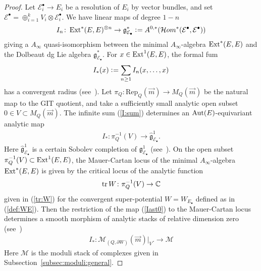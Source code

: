 \documentclass[11pt]{amsart}
\theoremstyle{plain}
\theoremstyle{definition}
\theoremstyle{remark}
\newcommand{\eE}{\mathcal{E}}
\newcommand{\hH}{\mathcal{H}}
\newcommand{\mM}{\mathcal{M}}
\newcommand{\Ext}{\mathop{\rm Ext}\nolimits}
\newcommand{\Aut}{\mathop{\rm Aut}\nolimits}
\newcommand{\tr}{\mathop{\rm tr}\nolimits}
\begin{document}
\begin{proof}
Let $\eE^{\bullet}_i \to E_i$ be a resolution of $E_i$ by vector bundles, 
and set 
$\eE^{\bullet}=\oplus_{i=1}^k V_i \otimes \eE_i^{\bullet}$. 
We have linear maps of degree $1-n$
\begin{align}\label{linear:I}
I_n \colon \Ext^{\ast}(E, E)^{\otimes n} \to 
\mathfrak{g}_{\eE_{\bullet}}^{\ast} \cneq
A^{0, \ast}(\hH om^{\ast}(\eE^{\bullet}, \eE^{\bullet}))
\end{align}
giving a $A_{\infty}$ quasi-isomorphism 
between the minimal 
$A_{\infty}$-algebra 
$\Ext^{\ast}(E, E)$ and
the Dolbeaut dg Lie algebra $\mathfrak{g}_{\eE_{\bullet}}^{\ast}$. 
 For $x \in \Ext^1(E, E)$, the formal fum
 \begin{align}\label{I:sum}
 I_{\ast}(x) \cneq \sum_{n\ge 1}I_n(x, \ldots, x)
 \end{align}
 has a convergent radius
 (see~\cite[Lemma~4.1]{Todstack}).
Let $\pi_Q \colon \mathrm{Rep}_Q(\vec{m}) \to M_Q(\vec{m})$ be the 
natural map to the GIT quotient,
and 
take a sufficiently small analytic open subset 
$0 \in V \subset M_Q(\vec{m})$. 
The infinite sum (\ref{I:sum})
determines an $\Aut(E)$-equivariant 
analytic map
\begin{align}\label{Iast0}
I_{\ast} \colon \pi_Q^{-1}(V) \to \widehat{\mathfrak{g}}_{\eE_{\bullet}}^1.
\end{align}
Here $\widehat{\mathfrak{g}}_{\eE_{\bullet}}^1$
is a certain Sobolev completion of 
$\mathfrak{g}_{\eE_{\bullet}}^1$
(see~\cite[Lemma~5.1]{Todstack}). 
On the open subset 
$\pi_Q^{-1}(V) \subset \Ext^1(E, E)$, the Mauer-Cartan 
locus of the minimal $A_{\infty}$-algebra
$\Ext^{\ast}(E, E)$
is given by the critical 
locus of 
the analytic function
\begin{align*}
\tr W \colon \pi_Q^{-1}(V) \to \mathbb{C}
\end{align*}
given
in (\ref{tr:W})
for 
the convergent super-potential 
$W=W_{E_{\bullet}}$ defined as in (\ref{def:WE}). 
Then the restriction of the map (\ref{Iast0}) 
to the Mauer-Cartan locus 
determines a smooth 
 morphism 
 of analytic stacks 
 of relative dimension zero (see~\cite[Proposition~4.3]{Todstack})
 \begin{align}\label{Iast}
 I_{\ast} \colon \mM_{(Q, \partial W)}(\vec{m})|_{V}. 
 \to \mM
 \end{align}
Here $\mM$ is the moduli stack of complexes given in 
Subsection~\ref{subsec:moduli:general}. 


\end{proof}
\end{document}
